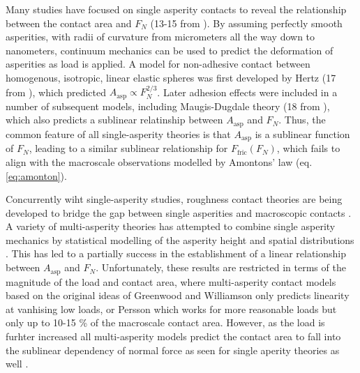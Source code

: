 Many studies have focused on single asperity contacts to reveal the relationship
between the contact area and $F_N$ (13-15 from \cite{mo_friction_2009}). By
assuming perfectly smooth asperities, with radii of curvature from micrometers
all the way down to nanometers, continuum mechanics can be used to predict the
deformation of asperities as load is applied. A model for non-adhesive
contact between homogenous, isotropic, linear elastic spheres was first
developed by Hertz (17 from \cite{mo_friction_2009}), which predicted
$A_{\text{asp}} \propto F_N^{2/3}$. Later adhesion effects were included in a
number of subsequent models, including Maugis-Dugdale theory (18 from
\cite{mo_friction_2009}), which also predicts a sublinear relatinship between
$A_{\text{asp}}$ and $F_N$. Thus, the common feature of all single-asperity
theories is that $A_{\text{asp}}$ is a sublinear function of $F_N$, leading to a
similar sublinear relationship for $F_\text{fric}(F_N)$, which fails to align
with the macroscale observations modelled by Amontons’ law (eq.
\eqref{eq:amonton}).




Concurrently wiht single-asperity studies, roughness contact theories are being developed \cite[8-10, 16 in ]{mo_friction_2009} to bridge the gap between single asperities and macroscopic contacts \cite{mo_friction_2009}. A variety of multi-asperity theories has attempted to combine single asperity
mechanics by statistical modelling of the asperity height and spatial
distributions \cite{CARBONE20082555}. This has led to a partially success in the establishment of a linear relationship between $A_{\text{asp}}$ and $F_N$. Unfortunately, these results are restricted
in terms of the magnitude of the load and contact area, where multi-asperity
contact models based on the original ideas of Greenwood and Williamson \cite{GW}
only predicts linearity at vanhising low loads, or Persson \cite{Persson} which
works for more reasonable loads but only up to 10-15 \% of the macroscale
contact area. However, as the load is furhter increased all multi-asperity models
predict the contact area to fall into the sublinear dependency of normal force
as seen for single aperity theories as well \cite{CARBONE20082555}.



